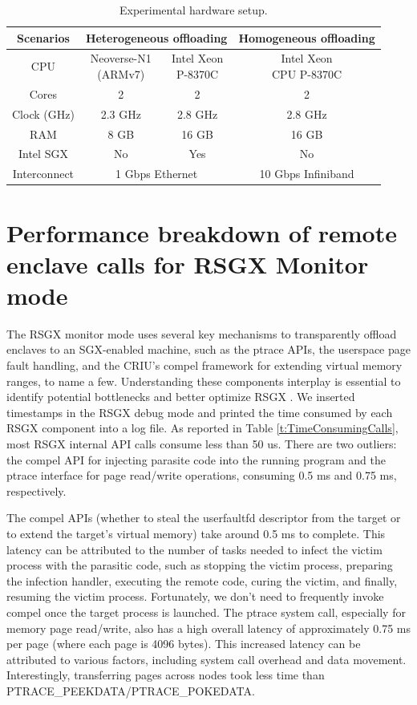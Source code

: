 \documentclass[article, doublespace,nopageskip]{VTthesis} %
\newcommand{\monitor}{RSGX \xspace}
\begin{document}
    \begin{table}[h]
	\centering
	\footnotesize
	\caption{Experimental hardware setup.}
	\begin{tabular}{| c | c | c | c |} \hline
		Scenarios & \multicolumn{2}{|c|}{Heterogeneous offloading} & Homogeneous offloading \\ \hline \hline
		CPU & \makecell{Neoverse-N1 \\(ARMv7)} & \makecell{Intel Xeon \\P-8370C} & \makecell{Intel Xeon \\CPU P-8370C} \\ \hline
		Cores & 2 & 2 & 2 \\ \hline
		Clock (GHz) & 2.3 GHz & 2.8 GHz & 2.8 GHz \\ \hline
		RAM & 8 GB & 16 GB & 16 GB \\ \hline
		Intel SGX & No & Yes & No \\ \hline
       Interconnect & \multicolumn{2}{|c|}{1 Gbps Ethernet} & 10 Gbps Infiniband \\ \hline
	\end{tabular}
	\label{t:setup}
    \end{table}
    
    \section{Performance breakdown of remote enclave calls for \monitor Monitor mode} \label{ase:Performance breakdown of remote enclave calls}
    The \monitor monitor mode uses several key mechanisms to transparently offload enclaves to an SGX-enabled machine, such as the ptrace APIs, the userspace page fault handling, and the CRIU's compel framework for extending virtual memory ranges, to name a few. Understanding these components interplay is essential to identify potential bottlenecks and better optimize \monitor. We inserted timestamps in the \monitor debug mode and printed the time consumed by each \monitor component into a log file. As reported in Table \ref{t:TimeConsumingCalls}, most \monitor internal API calls consume less than 50 us. There are two outliers: the compel API for injecting parasite code into the running program and the ptrace interface for page read/write operations, consuming 0.5 ms and 0.75 ms, respectively.

    The compel APIs (whether to steal the userfaultfd descriptor from the target or to extend the target’s virtual memory) take around 0.5 ms to complete. This latency can be attributed to the number of tasks needed to infect the victim process with the parasitic code, such as stopping the victim process, preparing the infection handler, executing the remote code, curing the victim, and finally, resuming the victim process. Fortunately, we don’t need to frequently invoke compel once the target process is launched. The ptrace system call, especially for memory page read/write, also has a high overall latency of approximately 0.75 ms per page (where each page is 4096 bytes). This increased latency can be attributed to various factors, including system call overhead and data movement. Interestingly, transferring pages across nodes took less time than PTRACE\_PEEKDATA/PTRACE\_POKEDATA.
\end{document}

